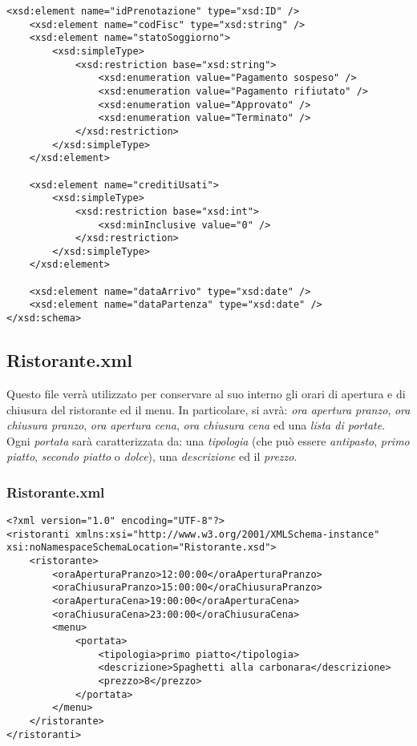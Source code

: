 \documentclass [a4paper, 12pt]{book}
\begin{document}
\begin{lstlisting}[style=XML]
    <xsd:element name="idPrenotazione" type="xsd:ID" />
    <xsd:element name="codFisc" type="xsd:string" />
    <xsd:element name="statoSoggiorno">
        <xsd:simpleType>
            <xsd:restriction base="xsd:string">
                <xsd:enumeration value="Pagamento sospeso" />
                <xsd:enumeration value="Pagamento rifiutato" />
                <xsd:enumeration value="Approvato" />
                <xsd:enumeration value="Terminato" />
            </xsd:restriction>
        </xsd:simpleType>
    </xsd:element>

    <xsd:element name="creditiUsati">
        <xsd:simpleType>
            <xsd:restriction base="xsd:int">
                <xsd:minInclusive value="0" />
            </xsd:restriction>
        </xsd:simpleType>
    </xsd:element>

    <xsd:element name="dataArrivo" type="xsd:date" />
    <xsd:element name="dataPartenza" type="xsd:date" />
</xsd:schema>
\end{lstlisting}
\subsection{Ristorante.xml}
Questo file verrà utilizzato per conservare al suo interno gli orari di apertura e di chiusura del ristorante ed il menu. In particolare, si avrà: \textit{ora apertura pranzo}, \textit{ora chiusura pranzo}, \textit{ora apertura cena}, \textit{ora chiusura cena} ed una \textit{lista di portate}. Ogni \textit{portata} sarà caratterizzata da:
una \textit{tipologia} (che può essere \textit{antipasto}, \textit{primo piatto}, \textit{secondo piatto} o \textit{dolce}), una \textit{descrizione} ed il \textit{prezzo}.
\subsubsection{Ristorante.xml}
\begin{lstlisting}[style=XML]
<?xml version="1.0" encoding="UTF-8"?>
<ristoranti xmlns:xsi="http://www.w3.org/2001/XMLSchema-instance" xsi:noNamespaceSchemaLocation="Ristorante.xsd">
    <ristorante>
        <oraAperturaPranzo>12:00:00</oraAperturaPranzo>
        <oraChiusuraPranzo>15:00:00</oraChiusuraPranzo>
        <oraAperturaCena>19:00:00</oraAperturaCena>
        <oraChiusuraCena>23:00:00</oraChiusuraCena>
        <menu>
            <portata>
                <tipologia>primo piatto</tipologia>
                <descrizione>Spaghetti alla carbonara</descrizione>
                <prezzo>8</prezzo>
            </portata>
        </menu>
    </ristorante>
</ristoranti>
\end{lstlisting}
\end{document}
